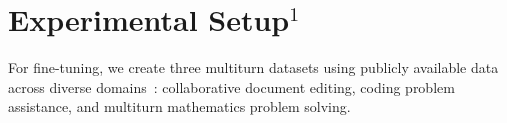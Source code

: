 \section{Experimental Setup$^1$}

\begin{comment}
We conducted extensive and large-scale experiments to answer the following research questions:
\begin{itemize}%
    \item How \textit{effective} are the \objects in collaborating with users? (Sec.~\ref{sec:quantitative})
    \item How do \objects outperform? What component is \textit{essential} to their success? 
    (Sec.~\ref{sec:ablation})
    \item What are the \textit{insights} from the generation results from interactive-trained LLMs? (Sec.~\ref{sec:case})
    \item Can the capabilities of interactive-trained LLMs \textit{generalize} to untrained data domains? (Sec.~\ref{sec:extended})
\end{itemize}
\end{comment}




For fine-tuning, we create three multiturn datasets using publicly available data across diverse domains~\citep{math, bigcodebench, medium}: collaborative document editing, coding problem assistance, and multiturn mathematics problem solving.

